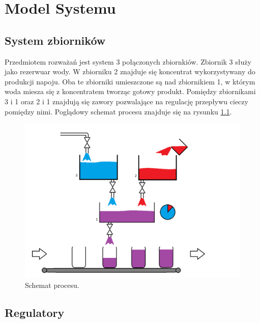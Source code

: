 \chapter{Model Systemu}
\section{System zbiorników}
\indent Przedmiotem rozważań jest system 3 połączonych zbiornkiów. Zbiornik 3 służy jako rezerwuar wody. W zbiorniku 2 znajduje się koncentrat wykorzystywany do produkcji napoju. Oba te zbiorniki umieszczone są nad zbiornikiem 1, w którym woda miesza się z koncentratem tworząc gotowy produkt. Pomiędzy zbiornikami 3 i 1 oraz 2 i 1 znajdują się zawory pozwalające na regulację przepływu cieczy pomiędzy nimi. Poglądowy schemat procesu znajduje się na rysunku \ref{fig:Proces}.
\begin{figure}[H]
	\centering
	\includegraphics[scale = 0.4]{fig/Proces_schema.png}
	\caption{Schemat procesu.}
	\label{fig:Proces}
\end{figure}

\section{Regulatory}

